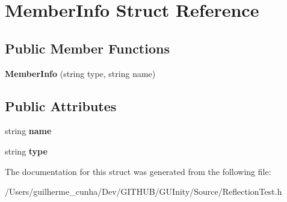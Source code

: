 \hypertarget{struct_member_info}{}\section{Member\+Info Struct Reference}
\label{struct_member_info}
\subsection*{Public Member Functions}
\begin{DoxyCompactItemize}
\item 
\hypertarget{struct_member_info_a3ed923c05fa1e724c9118bb98f1d6658}{}{\bfseries Member\+Info} (string type, string name)\label{struct_member_info_a3ed923c05fa1e724c9118bb98f1d6658}

\end{DoxyCompactItemize}
\subsection*{Public Attributes}
\begin{DoxyCompactItemize}
\item 
\hypertarget{struct_member_info_ac5de9c4eebf0a9b11b20138c366337c3}{}string {\bfseries name}\label{struct_member_info_ac5de9c4eebf0a9b11b20138c366337c3}

\item 
\hypertarget{struct_member_info_a7bf767382190d02cce54f319dd0e1f2e}{}string {\bfseries type}\label{struct_member_info_a7bf767382190d02cce54f319dd0e1f2e}

\end{DoxyCompactItemize}


The documentation for this struct was generated from the following file\+:\begin{DoxyCompactItemize}
\item 
/\+Users/guilherme\+\_\+cunha/\+Dev/\+G\+I\+T\+H\+U\+B/\+G\+U\+Inity/\+Source/Reflection\+Test.\+h\end{DoxyCompactItemize}
